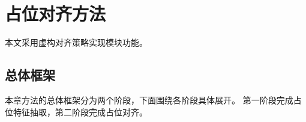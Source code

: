 \chapter{占位对齐方法}
本文采用虚构对齐策略实现模块功能。

\section{总体框架}
本章方法的总体框架分为两个阶段，下面围绕各阶段具体展开。
第一阶段完成占位特征抽取，第二阶段完成占位对齐。
